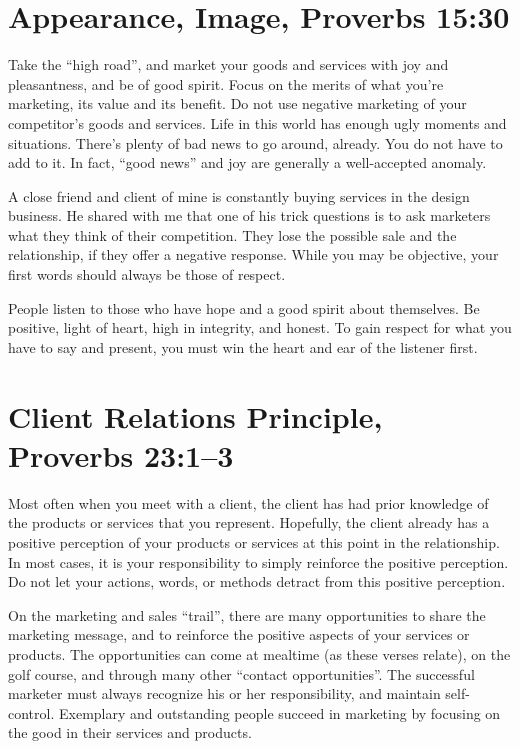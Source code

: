 \documentclass[12pt]{memoir}
\begin{document}
\section{Appearance, Image, Proverbs 15:30}

\label{appearance-image-proverbs-1530}

Take the ``high road'', and market your goods and services with
joy and pleasantness, and be of good spirit. Focus on the merits of
what you're marketing, its value and its benefit. Do not use negative
marketing of your competitor's goods and services. Life in this world
has enough ugly moments and situations. There's plenty of bad news
to go around, already. You do not have to add to it. In fact, ``good
news'' and joy are generally a well-accepted anomaly. 

A close friend and client of mine is constantly buying services in
the design business. He shared with me that one of his trick questions
is to ask marketers what they think of their competition. They lose
the possible sale and the relationship, if they offer a negative response.
While you may be objective, your first words should always be those
of respect.

People listen to those who have hope and a good spirit about themselves.
Be positive, light of heart, high in integrity, and honest. To gain
respect for what you have to say and present, you must win the heart
and ear of the listener first.

\section{Client Relations Principle, Proverbs 23:1--3}

Most often when you meet with a client, the client has had prior knowledge
of the products or services that you represent. Hopefully, the client
already has a positive perception of your products or services at
this point in the relationship. In most cases, it is your responsibility
to simply reinforce the positive perception. Do not let your actions,
words, or methods detract from this positive perception.

On the marketing and sales ``trail'', there are many opportunities
to share the marketing message, and to reinforce the positive aspects
of your services or products. The opportunities can come at mealtime
(as these verses relate), on the golf course, and through many other
``contact opportunities''. The successful marketer must always recognize
his or her responsibility, and maintain self-control. Exemplary and
outstanding people succeed in marketing by focusing on the good in
their services and products.
\end{document}
